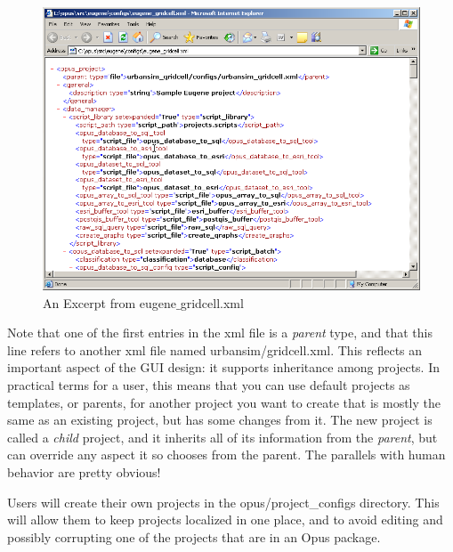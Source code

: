 \begin{figure}[htp]
\begin{center}
\includegraphics[scale=0.4]{graphics/opus-xml.png}
\end{center}
\caption{An Excerpt from eugene$\_$gridcell.xml}
\label{fig:opus-xml}
\end{figure}

Note that one of the first entries in the xml file is a \emph{parent} type, and that this line refers to another xml file named urbansim/gridcell.xml.  This reflects an important aspect of the GUI design: it supports inheritance among projects.  In practical terms for a user, this means that you can use default projects as templates, or parents, for another project you want to create that is mostly the same as an existing project, but has some changes from it.  The new project is called a \emph{child} project, and it inherits all of its information from the \emph{parent}, but can override any aspect it so chooses from the parent.  The parallels with human behavior are pretty obvious!

Users will create their own projects in the opus/project\_configs directory.  This will allow them to keep projects localized in one place, and to avoid editing and possibly corrupting one of the projects that are in an Opus package.
